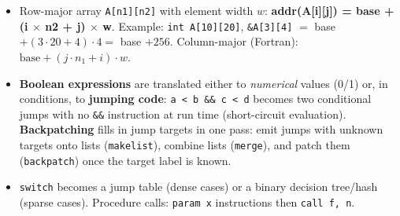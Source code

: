 \documentclass[10pt,a4paper,openany,oneside]{report}
\begin{document}
\begin{mustbox}
\begin{itemize}[nosep]
\item Row-major array \texttt{A[n1][n2]} with element width $w$: \textbf{addr(A[i][j]) = base + (i $\times$ n2 + j) $\times$ w}. Example: \texttt{int A[10][20]}, \texttt{\&A[3][4]} $=$ base $+(3\cdot20+4)\cdot4=$ base $+256$. Column-major (Fortran): $\text{base}+(j\cdot n_1+i)\cdot w$.
\item \textbf{Boolean expressions} are translated either to \emph{numerical} values (0/1) or, in conditions, to \textbf{jumping code}: \texttt{a < b \&\& c < d} becomes two conditional jumps with no \texttt{\&\&} instruction at run time (short-circuit evaluation). \textbf{Backpatching} fills in jump targets in one pass: emit jumps with unknown targets onto lists (\texttt{makelist}), combine lists (\texttt{merge}), and patch them (\texttt{backpatch}) once the target label is known.
\item \texttt{switch} becomes a jump table (dense cases) or a binary decision tree/hash (sparse cases). Procedure calls: \texttt{param x} instructions then \texttt{call f, n}.
\end{itemize}
\end{mustbox}
\end{document}
